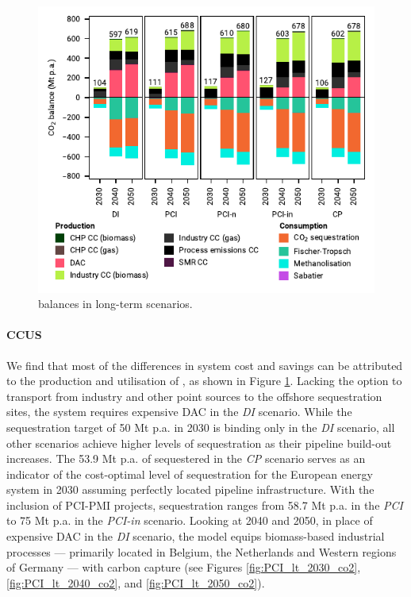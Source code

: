 \documentclass[preprint,12pt,sort&compress]{elsarticle}
\begin{document}
\begin{figure}[htbp]
  \centering
  \includegraphics{balances_overview_co2 stored}
  \caption{ balances in long-term scenarios.}
  \label{fig:balances_overview_co2_stored}
\end{figure}

\paragraph{CCUS}
\label{sec:ccus}
We find that most of the differences in system cost and savings can be attributed to the production and utilisation of , as shown in Figure \ref{fig:balances_overview_co2_stored}. Lacking the option to transport  from industry and other point sources to the offshore sequestration sites, the system requires expensive DAC in the \textit{DI} scenario. While the sequestration target of 50 Mt p.a. in 2030 is binding only in the \textit{DI} scenario, all other scenarios achieve higher levels of  sequestration as their  pipeline build-out increases. 
The 53.9 Mt p.a. of  sequestered in the \textit{CP} scenario serves as an indicator of the cost-optimal level of sequestration for the European energy system in 2030 assuming perfectly located pipeline infrastructure. With the inclusion of PCI-PMI projects,  sequestration ranges from 58.7 Mt p.a. in the \textit{PCI} to 75 Mt p.a. in the \textit{PCI-in} scenario. 
Looking at 2040 and 2050, in place of expensive DAC in the \textit{DI} scenario, the model equips biomass-based industrial processes --- primarily located in Belgium, the Netherlands and Western regions of Germany --- with carbon capture (see Figures \ref{fig:PCI_lt_2030_co2}, \ref{fig:PCI_lt_2040_co2}, and \ref{fig:PCI_lt_2050_co2}). 
\end{document}
